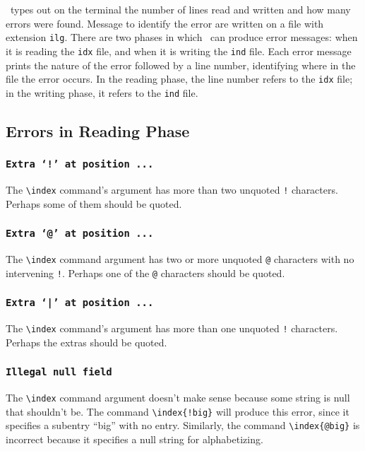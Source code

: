 \MakeIndex\ types out on the terminal the number of lines read and
written and how many errors were found.  Message to identify the error
are written on a file with extension {\tt ilg}.  There are two phases
in which \MakeIndex\ can produce error messages: when it is reading the
{\tt idx} file, and when it is writing the {\tt ind} file.  Each error
message prints the nature of the error followed by a line number,
identifying where in the file the error occurs.  In the reading phase,
the line number refers to the {\tt idx} file; in the writing phase, it
refers to the {\tt ind} file.

\subsection{Errors in Reading Phase}

\subsubsection*{\tt Extra `!' at position ...}

The \verb|\index| command's argument has more than two unquoted
\verb|!| characters.  Perhaps some of them should be quoted.

\subsubsection*{\tt Extra `@' at position ...}

The \verb|\index| command argument has two or more unquoted \verb|@|
characters with no intervening \verb|!|.  Perhaps one of the \verb|@|
characters should be quoted.

\subsubsection*{\tt Extra `|' at position ...}

The \verb|\index| command's argument has more than one unquoted \verb|!|
characters.  Perhaps the extras should be quoted.

\subsubsection*{\tt Illegal null field}

The \verb|\index| command argument doesn't make sense because some
string is null that shouldn't be.  The command \verb|\index{!big}| will
produce this error, since it specifies a subentry ``big'' with no
entry.  Similarly, the command \verb|\index{@big}| is incorrect because
it specifies a null string for alphabetizing.

